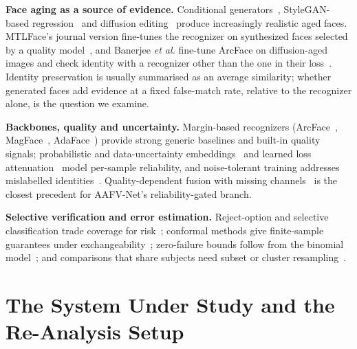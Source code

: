 \documentclass[journal]{IEEEtran}
\begin{document}
\textbf{Face aging as a source of evidence.} Conditional generators~\cite{tang2018ipcgan,huang2021pfagan}, StyleGAN-based regression~\cite{alaluf2021sam,karras2020stylegan2} and diffusion editing~\cite{chen2023fading,banerjee2023aging,luevano2025aging} produce increasingly realistic aged faces. MTLFace's journal version fine-tunes the recognizer on synthesized faces selected by a quality model~\cite{huang2022mtlfacetpami}, and Banerjee \emph{et al.} fine-tune ArcFace on diffusion-aged images and check identity with a recognizer other than the one in their loss~\cite{banerjee2023aging}. Identity preservation is usually summarised as an average similarity; whether generated faces add evidence at a fixed false-match rate, relative to the recognizer alone, is the question we examine.

\textbf{Backbones, quality and uncertainty.} Margin-based recognizers (ArcFace~\cite{deng2019arcface}, MagFace~\cite{meng2021magface}, AdaFace~\cite{kim2022adaface}) provide strong generic baselines and built-in quality signals; probabilistic and data-uncertainty embeddings~\cite{shi2019pfe,chang2020dul} and learned loss attenuation~\cite{kendall2017uncertainty} model per-sample reliability, and noise-tolerant training addresses mislabelled identities~\cite{deng2020subcenter}. Quality-dependent fusion with missing channels~\cite{poh2009quality} is the closest precedent for AAFV-Net's reliability-gated branch.

\textbf{Selective verification and error estimation.} Reject-option and selective classification trade coverage for risk~\cite{chow1970reject,geifman2017selective}; conformal methods give finite-sample guarantees under exchangeability~\cite{vovk2005alrw,angelopoulos2024crc,tibshirani2019covshift}; zero-failure bounds follow from the binomial model~\cite{clopper1934,hanley1983rule3}; and comparisons that share subjects need subset or cluster resampling~\cite{bolle2004subsets,schuckers2010book,iso19795_1}.

\section{The System Under Study and the Re-Analysis Setup}
\label{sec:setup}
\end{document}
